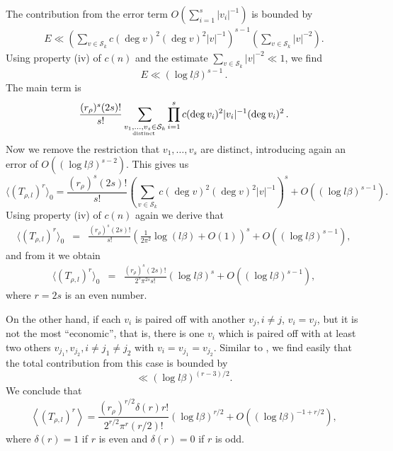 \documentclass[12pt]{amsart}
\theoremstyle{plain}
\begin{document}
The contribution from the error term $O\left(\sum_{i=1}^s |v_i|^{-1}\right)$ is bounded by
\begin{eqnarray*} E \ll \left(\sum_{v \in {\mathcal{S}_k}} c(\deg v)^2 (\deg v)^2 |v|^{-1}\right)^{s-1} \left(\sum_{v \in {\mathcal{S}_k}} |v|^{-2} \right). \end{eqnarray*}
Using property (iv) of $c(n)$ and the estimate $\sum_{v \in {\mathcal{S}_k}} |v|^{-2} \ll 1$, we find
\[E \ll \left(\log l \beta\right)^{s-1}\,.\]
The main term is
\[\frac{(r_{\rho})^s(2s)!}{s! }\sum_{\substack{v_1, \ldots, v_{s} \in {\mathcal{S}_k}
\\ \mbox{\tiny distinct } }} \prod_{i=1}^{s} c(\deg v_i)^2 |v_i|^{-1} (\deg v_i)^2  \,.\]
Now we remove the restriction that $v_1, \ldots, v_s$ are distinct, introducing again an error of $O\left(\left(\log l \beta\right)^{s-2}\right)$. This gives us
\[\langle \left(T_{\rho,l}\right)^{r} \rangle_0= \frac{(r_{\rho})^s(2s)!}{s! } \left(\sum_{v \in {\mathcal{S}_k}} c(\deg v)^2 (\deg v)^2 |v|^{-1}\right)^{s} +O\left(\left(\log l \beta\right)^{s-1}\right).\]
Using property (iv) of $c(n)$ again we derive that
\begin{eqnarray*} \langle \left(T_{\rho,l}\right)^{r} \rangle_0&=& \frac{(r_{\rho})^s(2s)!}{s!} \left(\frac{1}{2 \pi^2} \log (l \beta)+O(1)\right)^{s} +O\left(\left(\log l \beta\right)^{s-1}\right), \end{eqnarray*}
and from it we obtain
\begin{eqnarray*} \label{3:main}
\langle \left(T_{\rho,l}\right)^{r} \rangle_0 & = &  \frac{ (r_{\rho})^s(2s)!}{2^s \pi^{2s} s! } \left(\log l\beta\right)^s + O\left(\left(\log l \beta\right)^{s-1}\right),\end{eqnarray*}
where $r=2s$ is an even number.

On the other hand, if each $v_i$ is paired off with another $v_j, i \ne j$, $v_i=v_j$, but it is not the most ``economic'', that is, there is one $v_i$ which is paired off with at least two others $v_{j_1}, v_{j_2}, i \ne j_1 \ne j_2$ with $v_i=v_{j_1}=v_{j_2}$. Similar to \cite[4.2.2 Case two]{xio}, we find easily that the total contribution from this case is bounded by
\[\ll (\log l \beta)^{(r-3)/2}. \]
We conclude that
\[\left\langle (T_{\rho,l})^r \right\rangle =\frac{(r_{\rho})^{r/2}\delta(r) r!}{2^{r/2}\pi^r (r/2)!}(\log l \beta)^{r/2} +O\left((\log l \beta)^{-1+r/2}\right),\]
where $\delta(r)=1$ if $r$ is even and $\delta(r)=0$ if $r$ is odd.
\end{document}
